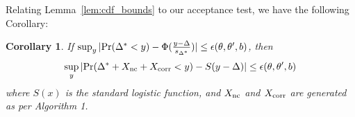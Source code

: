 \documentclass[twoside]{article} \usepackage{aistats2017}
\newtheorem{corollary}{Corollary}
\begin{document}


Relating Lemma~\ref{lem:cdf_bounds} to our acceptance test, we have the
following Corollary:

\begin{corollary}\label{cor:bounds_preserved}
If $\sup_y|{\rm Pr}(\Delta^* < y) - \Phi(\frac{y-\Delta}{s_{\Delta^*}})|
\leq \epsilon(\theta,\theta',b)$, then
\begin{equation}
    \sup_y|{\rm Pr}(\Delta^*+X_{\rm nc}+X_{\rm corr} < y) - S(y-\Delta)| \leq \epsilon(\theta,\theta',b)
\end{equation}
where $S(x)$ is the standard logistic function, and $X_{\rm nc}$ and $X_{\rm corr}$ are generated as per Algorithm 1. 
\end{corollary}
\end{document}

